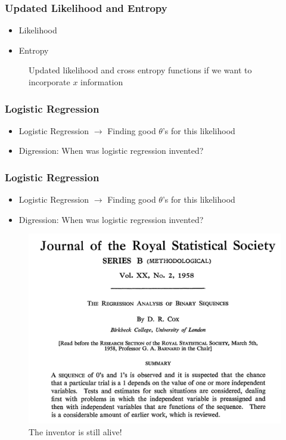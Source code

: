 \documentclass[10pt,mathserif]{beamer}
\begin{document}
\begin{frame}
  \frametitle{Updated Likelihood and Entropy}
  \begin{itemize}
  \item Likelihood
  \item Entropy
  \end{itemize}
  \begin{figure}
    \centering
    \caption{Updated likelihood and cross entropy functions if we want to
      incorporate $x$ information
      \label{fig:logistic_nonlinear_scatter} }
  \end{figure}
\end{frame}

\begin{frame}
  \frametitle{Logistic Regression}
  \begin{itemize}
  \item Logistic Regression $\rightarrow$ Finding good $\theta$'s for this
    likelihood
  \item Digression: When was logistic regression invented?
  \end{itemize}
\end{frame}

\begin{frame}
  \frametitle{Logistic Regression}
  \begin{itemize}
  \item Logistic Regression $\rightarrow$ Finding good $\theta$'s for this
    likelihood
  \item Digression: When was logistic regression invented?
  \end{itemize}
  \begin{figure}[ht]
    \centering
    \includegraphics[width=0.4\paperwidth]{figure/logistic_paper}
    \caption{The inventor is still alive! \label{fig:logistic_paper} }
  \end{figure}
\end{frame}
\end{document}
